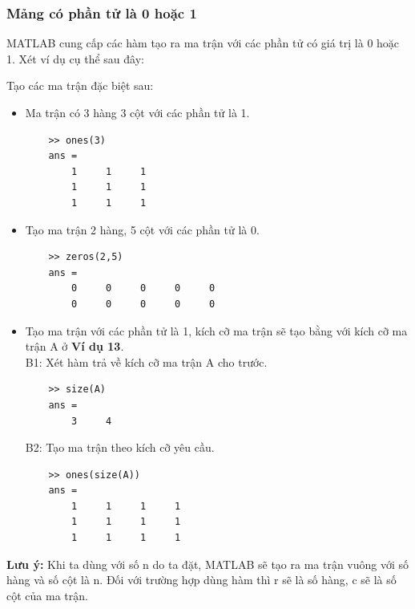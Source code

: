 \documentclass[12pt,a4paper]{article}
\begin{document}
\subsubsection{Mảng có phần tử là 0 hoặc 1}
MATLAB cung cấp các hàm tạo ra ma trận với các phần tử có giá trị là 0 hoặc 1. Xét ví dụ cụ thể sau đây:
\begin{example}
Tạo các ma trận đặc biệt sau:
\begin{itemize}
	\item Ma trận có 3 hàng 3 cột với các phần tử là 1.
\begin{lstlisting}
	>> ones(3)
	ans =
     	1     1     1
     	1     1     1
     	1     1     1
\end{lstlisting}
	\item Tạo ma trận 2 hàng, 5 cột với các phần tử là 0.
\begin{lstlisting}
	>> zeros(2,5)
	ans =
     	0     0     0     0     0
     	0     0     0     0     0
\end{lstlisting}
	\item Tạo ma trận với các phần tử là 1, kích cỡ ma trận sẽ tạo bằng với kích cỡ ma trận A ở \textbf{Ví dụ 13}.\\
B1: Xét hàm trả về kích cỡ ma trận A cho trước.
\begin{lstlisting}
	>> size(A)
	ans =
     	3     4
\end{lstlisting}
B2: Tạo ma trận theo kích cỡ yêu cầu.
\begin{lstlisting}
	>> ones(size(A))
	ans =
     	1     1     1     1
     	1     1     1     1
     	1     1     1     1
\end{lstlisting}
\end{itemize}
\textbf{Lưu ý:} Khi ta dùng  với số n do ta đặt, MATLAB sẽ tạo ra ma trận vuông với số hàng và số cột là n. Đối với trường hợp dùng hàm  thì r sẽ là số hàng, c sẽ là số cột của ma trận.
\end{example}
\end{document}
